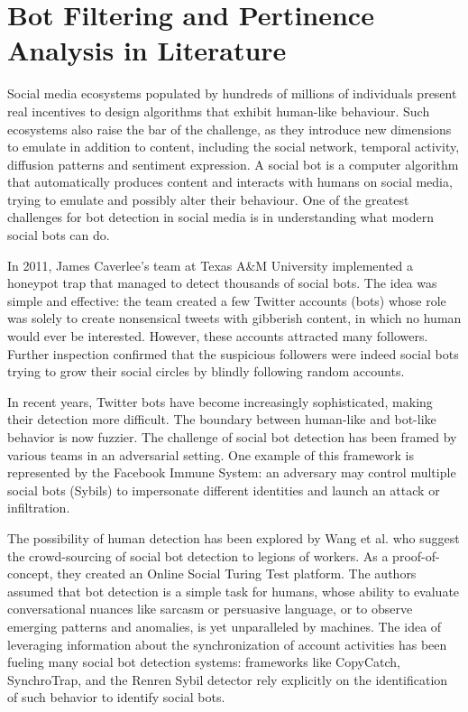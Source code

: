 \documentclass[conference, onecolumn]{IEEEtran}
\begin{document}
\section{Bot Filtering and Pertinence Analysis in Literature}\label{sec:literature}
\medskip
Social media ecosystems populated by hundreds of millions of individuals present real incentives to design algorithms that exhibit human-like behaviour. Such ecosystems also raise the bar of the challenge, as they introduce new dimensions to emulate in addition to content, including the social network, temporal activity, diffusion patterns and sentiment expression. 
A social bot is a computer algorithm that automatically produces content and interacts with humans on social media, trying to emulate and possibly alter their behaviour.
One of the greatest challenges for bot detection in social media is in understanding what modern social bots can do.
\medskip

In 2011, James Caverlee's team at Texas A\&M University implemented a honeypot trap that managed to detect thousands of social bots. The idea was simple and effective: the team created a few Twitter accounts (bots) whose role was solely to create nonsensical tweets with gibberish content, in which no human would ever be interested. However, these accounts attracted many followers. Further inspection confirmed that the suspicious followers were indeed social bots trying to grow their social circles by blindly following random accounts.
\medskip

In recent years, Twitter bots have become increasingly sophisticated, making their detection more difficult. The boundary between human-like and bot-like behavior is now fuzzier.
The challenge of social bot detection has been framed by various teams in an adversarial setting. One example of this framework is represented by the Facebook Immune System: an adversary may control multiple social bots (Sybils) to impersonate different identities and launch an attack or infiltration.
\medskip

The possibility of human detection has been explored by Wang et al.  who suggest the crowd-sourcing of social bot detection to legions of workers. As a proof-of-concept, they created an Online Social Turing Test platform. The authors assumed that bot detection is a simple task for humans, whose ability to evaluate conversational nuances like sarcasm or persuasive language, or to observe emerging patterns and anomalies, is yet unparalleled by machines.  The idea of leveraging information about the synchronization of account activities has been fueling many social bot detection systems: frameworks like CopyCatch, SynchroTrap, and the Renren Sybil detector rely explicitly on the identification of such behavior to identify social bots.
\medskip
\end{document}

